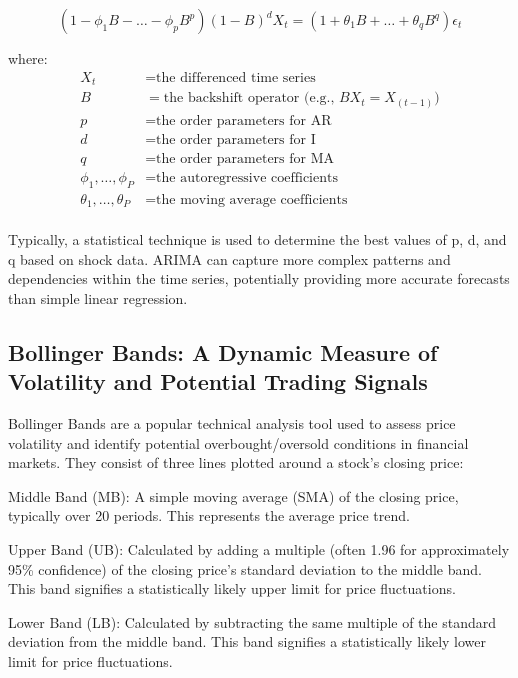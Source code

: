 \documentclass[9pt,a4paper,twoside]{tau}
\begin{document}
        \begin{equation}
        (1 - \phi_1B - \dots - \phi_pB^p)(1-B)^d X_t = (1 + \theta_1B + \dots + \theta_qB^q) \epsilon_t
        \end{equation}
        
        where:
        \begin{align*}
        X_t &= \text{the differenced time series}\\
        B &= \text{the backshift operator (e.g., $BX_t=X_(t−1)$)}\\
        p &= \text{the order parameters for AR}\\
        d &= \text{the order parameters for I}\\
        q &= \text{the order parameters for MA}\\
        \phi_1,  \dots ,  \phi_P &= \text{the autoregressive coefficients}\\
        \theta_1,  \dots ,  \theta_P &= \text{the moving average coefficients}\\
        \end{align*}  
           
         Typically, a statistical technique is used to determine the best values of p, d, and q based on shock data. ARIMA can capture more complex patterns and dependencies within the time series, potentially providing more accurate forecasts than simple linear regression.

    \subsection{Bollinger Bands: A Dynamic Measure of Volatility and Potential Trading Signals}
    
        Bollinger Bands are a popular technical analysis tool used to assess price volatility and identify potential overbought/oversold conditions in financial markets.  They consist of three lines plotted around a stock's closing price:
        
        Middle Band (MB): A simple moving average (SMA) of the closing price, typically over 20 periods. This represents the average price trend.
        
        Upper Band (UB): Calculated by adding a multiple (often 1.96 for approximately 95\% confidence) of the closing price's standard deviation to the middle band. This band signifies a statistically likely upper limit for price fluctuations.
        
        Lower Band (LB): Calculated by subtracting the same multiple of the standard deviation from the middle band. This band signifies a statistically likely lower limit for price fluctuations.
        
\end{document}
